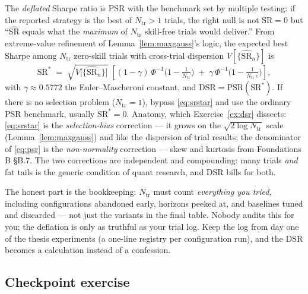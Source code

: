 \documentclass[11pt]{article}
\numberwithin{equation}{section}
\theoremstyle{plain}
\theoremstyle{definition}
\theoremstyle{remark}
\newcounter{exercise}
\newcommand{\SR}{\mathrm{SR}}
\begin{document}
The \emph{deflated} Sharpe ratio is PSR with the benchmark set by multiple testing: if the reported strategy is the best of $N_{\mathrm{tr}}>1$ trials, the right null is not $\SR = 0$ but ``$\widehat{\SR}$ equals what the \emph{maximum} of $N_{\mathrm{tr}}$ skill-free trials would deliver.'' From extreme-value refinement of Lemma~\ref{lem:maxgauss}'s logic, the expected best Sharpe among $N_{\mathrm{tr}}$ zero-skill trials with cross-trial dispersion $V[\{\widehat{\SR}_n\}]$ is
\begin{equation}
\SR^\ast \;=\; \sqrt{V\big[\{\widehat{\SR}_n\}\big]}\;\left[ (1 - \gamma)\, \Phi^{-1}\!\Big(1 - \tfrac{1}{N_{\mathrm{tr}}}\Big) \;+\; \gamma\, \Phi^{-1}\!\Big(1 - \tfrac{1}{N_{\mathrm{tr}}\, e}\Big) \right],
\label{eq:srstar}
\end{equation}
with $\gamma \approx 0.5772$ the Euler--Mascheroni constant, and $\mathrm{DSR} = \mathrm{PSR}(\SR^\ast)$. If there is no selection problem ($N_{\mathrm{tr}}=1$), bypass \eqref{eq:srstar} and use the ordinary PSR benchmark, usually $\SR^\ast=0$. Anatomy, which Exercise~\ref{ex:dsr} dissects: \eqref{eq:srstar} is the \emph{selection-bias} correction --- it grows on the $\sqrt{2 \log N_{\mathrm{tr}}}$ scale (Lemma~\ref{lem:maxgauss}) and like the dispersion of trial results; the denominator of \eqref{eq:psr} is the \emph{non-normality} correction --- skew and kurtosis from Foundations B \S B.7. The two corrections are independent and compounding: many trials \emph{and} fat tails is the generic condition of quant research, and DSR bills for both.

\begin{finbox}
The honest part is the bookkeeping: $N_{\mathrm{tr}}$ must count \emph{everything you tried}, including configurations abandoned early, horizons peeked at, and baselines tuned and discarded --- not just the variants in the final table. Nobody audits this for you; the deflation is only as truthful as your trial log. Keep the log from day one of the thesis experiments (a one-line registry per configuration run), and the DSR becomes a calculation instead of a confession.
\end{finbox}


\subsection*{Checkpoint exercise}
\end{document}
